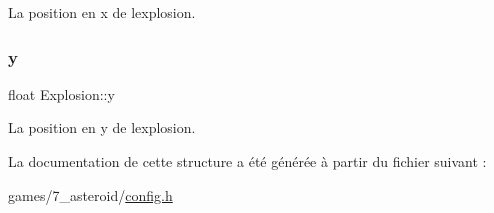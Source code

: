 La position en x de l\textquotesingle{}explosion. 

\mbox{\label{struct_explosion_ac51df5775e258c0a7d77e0edf9589760}} 
\subsubsection{\texorpdfstring{y}{y}}
{\footnotesize\ttfamily float Explosion\+::y}



La position en y de l\textquotesingle{}explosion. 



La documentation de cette structure a été générée à partir du fichier suivant \+:\begin{DoxyCompactItemize}
\item 
games/7\+\_\+asteroid/\hyperlink{7__asteroid_2config_8h}{config.\+h}\end{DoxyCompactItemize}
